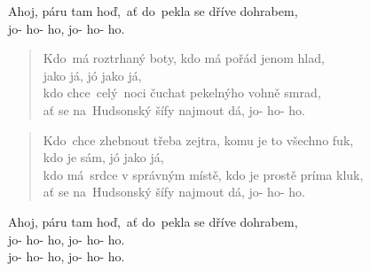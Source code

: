 \begin{song}{}
\begin{verse}
\end{verse}
\begin{refren}
   Ahoj, páru tam hoď,~ať do~pekla se dříve dohrabem, \\
   jo- ho- ho, jo- ho- ho.
\end{refren}
\begin{verse}
   Kdo~má roztrhaný boty, kdo má pořád jenom hlad, \\
   jako já, jó jako já, \\
   kdo chce~celý~noci čuchat pekelnýho vohně smrad, \\
   ať se na~Hudsonský šífy najmout dá, jo- ho- ho.
\end{verse}
\begin{verse}
   Kdo~chce zhebnout třeba zejtra, komu je to všechno fuk, \\
   kdo je sám, jó jako já, \\
   kdo má~srdce v správným místě, kdo je prostě príma kluk, \\
   ať se na~Hudsonský šífy najmout dá, jo- ho- ho.
\end{verse}
\begin{refren}
   Ahoj, páru tam hoď,~ať do~pekla se dříve dohrabem, \\
   jo- ho- ho, jo- ho- ho. \\
   jo- ho- ho, jo- ho- ho.
\end{refren}
  \begin{chords}
    \chordpowerG \chordpowerGsharp \chordpowerAm
  \end{chords}
\end{song}
\pagebreak
